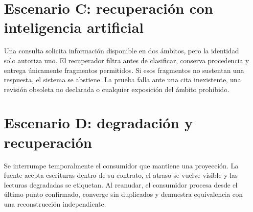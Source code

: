 \section{Escenario C: recuperación con inteligencia artificial}

Una consulta solicita información disponible en dos ámbitos, pero la identidad solo
autoriza uno. El recuperador filtra antes de clasificar, conserva procedencia y entrega
únicamente fragmentos permitidos. Si esos fragmentos no sustentan una respuesta, el
sistema se abstiene. La prueba falla ante una cita inexistente, una revisión obsoleta no
declarada o cualquier exposición del ámbito prohibido.

\section{Escenario D: degradación y recuperación}

Se interrumpe temporalmente el consumidor que mantiene una proyección. La fuente acepta
escrituras dentro de su contrato, el atraso se vuelve visible y las lecturas degradadas
se etiquetan. Al reanudar, el consumidor procesa desde el último punto confirmado,
converge sin duplicados y demuestra equivalencia con una reconstrucción independiente.

